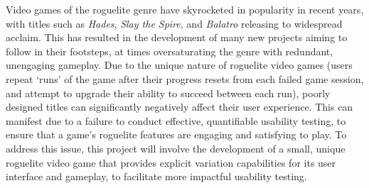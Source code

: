 Video games of the roguelite genre have skyrocketed in popularity in recent 
years, with titles such as \textit{Hades}, \textit{Slay the Spire}, and 
\textit{Balatro} releasing to widespread acclaim. This has resulted in the 
development of many new projects aiming to follow in their footsteps, at times 
oversaturating the genre with redundant, unengaging gameplay. 
Due to the 
unique nature of roguelite video games (users repeat `runs' of the game after 
their 
progress resets from each failed game session, and attempt to upgrade their 
ability 
to succeed between each 
run), poorly designed titles can significantly negatively affect their user 
experience. This can manifest due to a failure to conduct effective, 
quantifiable 
usability 
testing, to ensure that a game's roguelite features are engaging 
and satisfying to play. To address this issue, this project will involve the 
development of a small, unique roguelite video game that provides explicit 
variation 
capabilities for its user interface and gameplay, to facilitate more impactful 
usability 
testing.
